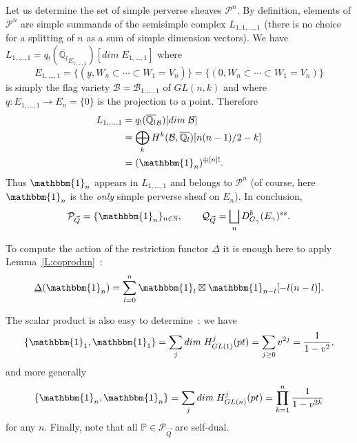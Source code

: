 \documentclass[a4paper,10pt]{amsart}
\def\N{\mathbb{N}}
\def\qlb{\overline{\mathbb{Q}_l}}
\def\QQ{\mathcal{Q}_{\vec{Q}}}
\numberwithin{equation}{section}
\begin{document}
Let us determine the set of simple perverse sheaves $\mathcal{P}^n$. By definition, elements of $\mathcal{P}^n$ are simple summands of the semisimple complex $L_{1,1, \ldots, 1}$ (there is no choice for a splitting of $n$ as a sum of simple dimension vectors). We have $L_{1, \ldots, 1}=q_! (\qlb_{E_{1, \ldots, 1}})[dim\;E_{1, \ldots, 1}]$
where 
$$E_{1, \ldots, 1}=\big\{ ( \underline{y}, W_n \subset \cdots \subset W_1=V_n)\big\}=\big\{(0,W_n \subset \cdots \subset W_1=V_n)\big\}$$
is simply the flag variety $\mathcal{B}=\mathcal{B}_{1, \ldots, 1}$ of $GL(n,k)$ and where $q: E_{1, \ldots, 1} \to E_{n}=\{0\}$ is the projection to a point. Therefore 
\begin{equation}\label{E:n1}
\begin{split}
L_{1, \ldots, 1}&=
q_!(\qlb_{\mathcal{B}})[dim\;\mathcal{B}]\\
&=\bigoplus_k H^k(\mathcal{B}, \qlb)[n(n-1)/2-k]\\
&= (\mathbbm{1}_n)^{\oplus[n]!}.
\end{split}
\end{equation}
Thus $\mathbbm{1}_n$ appears in $L_{1, \ldots, 1}$ and  belongs to $\mathcal{P}^n$ (of course, here $\mathbbm{1}_n$ is the \textit{only} simple perverse sheaf on $E_n$). In conclusion, $$\mathcal{P}_{\vec{Q}}=\{\mathbbm{1}_n\}_{n \in \N}, \qquad \QQ=\bigsqcup_n D^b_{G_{\gamma}}(E_{\gamma})^{ss}.$$

\vspace{.1in}

To compute the action of the restriction functor $\underline{\Delta}$ it is enough here to apply Lemma~\ref{L:coprodun}~:
\begin{equation}
\underline{\Delta}(\mathbbm{1}_n)=\sum_{l=0}^n \mathbbm{1}_l \boxtimes \mathbbm{1}_{n-l}[-l(n-l)].
\end{equation}

The scalar product is also easy to determine~: we have 
\begin{equation}\label{E:22}
\{\mathbbm{1}_1, \mathbbm{1}_1\}=\sum_j dim\; H^j_{GL(1)}(pt)=\sum_{j \geq 0} v^{2j}=\frac{1}{1-v^{2}},
\end{equation}
and more generally
\begin{equation}\label{E:23}
\{\mathbbm{1}_n, \mathbbm{1}_n\}=\sum_j dim\;H^j_{GL(n)}(pt)=\prod_{k=1}^n\frac{1}{1-v^{2k}}
\end{equation}
for any $n$. Finally, note that all $\mathbb{P} \in \mathcal{P}_{\vec{Q}}$ are self-dual.

\vspace{.2in}
\end{document}
